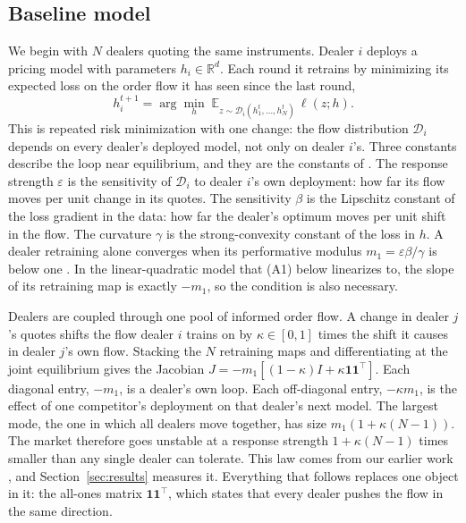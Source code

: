 \documentclass[conference]{IEEEtran}
\theoremstyle{definition}
\newcommand{\ones}{\mathbf{1}\mathbf{1}^{\top}}
\begin{document}
\subsection{Baseline model}\label{sec:baseline}
We begin with $N$ dealers quoting the same instruments. Dealer $i$ deploys a
pricing model with parameters $h_i \in \mathbb{R}^d$. Each round it retrains
by minimizing its expected loss on the order flow it has seen since the last
round,
\begin{equation}
  h_i^{t+1} = \arg\min_{h}\;
  \mathbb{E}_{z \sim \mathcal{D}_i(h_1^{t},\dots,h_N^{t})}\,\ell(z;h).
  \label{eq:rrm}
\end{equation}
This is repeated risk minimization \cite{perdomo2020} with one change: the
flow distribution $\mathcal{D}_i$ depends on every dealer's deployed model,
not only on dealer $i$'s. Three constants describe the loop near equilibrium,
and they are the constants of \cite{perdomo2020}. The response strength
$\varepsilon$ is the sensitivity of $\mathcal{D}_i$ to dealer $i$'s own
deployment: how far its flow moves per unit change in its quotes. The
sensitivity $\beta$ is the Lipschitz constant of the loss gradient in the
data: how far the dealer's optimum moves per unit shift in the flow. The
curvature $\gamma$ is the strong-convexity constant of the loss in $h$. A
dealer retraining alone converges when its performative modulus
$m_1 = \varepsilon\beta/\gamma$ is below one \cite{perdomo2020}. In the linear-quadratic model that (A1) below
linearizes to, the slope of its retraining map is exactly $-m_1$, so the
condition is also necessary.

Dealers are coupled through one pool of informed order flow. A change in
dealer $j$'s quotes shifts the flow dealer $i$ trains on by
$\kappa \in [0,1]$ times the shift it causes in dealer $j$'s own flow.
Stacking the $N$ retraining maps and differentiating at the joint equilibrium
gives the Jacobian $J = -m_1[(1-\kappa)I + \kappa\ones]$. Each diagonal entry,
$-m_1$, is a dealer's own loop. Each off-diagonal entry, $-\kappa m_1$, is the
effect of one competitor's deployment on that dealer's next model. The largest
mode, the one in which all dealers move together, has size
$m_1(1+\kappa(N-1))$. The market therefore goes unstable at a response
strength $1+\kappa(N-1)$ times smaller than any single dealer can tolerate.
This law comes from our earlier work \cite{reflex2026}, and
Section~\ref{sec:results} measures it. Everything that follows replaces one
object in it: the all-ones matrix $\ones$, which states that every dealer
pushes the flow in the same direction.
\end{document}
